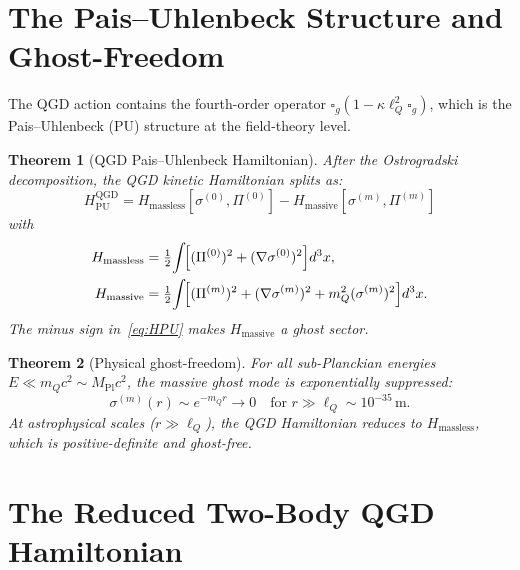 \documentclass[11pt,a4paper]{article}
\theoremstyle{plain}
\newtheorem{theorem}{Theorem}[section]
\theoremstyle{definition}
\theoremstyle{remark}
\newcommand{\lQ}{\ell_Q}
\newcommand{\mQ}{m_Q}
\newcommand{\boxg}{\square_g}
\newcommand{\half}{\tfrac{1}{2}}
\newcommand{\HPU}{H_{\mathrm{PU}}}
\begin{document}
\section{The Pais--Uhlenbeck Structure and Ghost-Freedom}
\label{sec:PU}

The QGD action contains the fourth-order operator
$\boxg(1 - \kappa\lQ^2\boxg)$, which is the Pais--Uhlenbeck (PU) structure
at the field-theory level.

\begin{theorem}[QGD Pais--Uhlenbeck Hamiltonian]\label{thm:PU}
After the Ostrogradski decomposition, the QGD kinetic Hamiltonian splits as:
\begin{equation}
  \HPU^{\mathrm{QGD}} = H_{\mathrm{massless}}[\sigma^{(0)},\Pi^{(0)}]
  - H_{\mathrm{massive}}[\sigma^{(m)},\Pi^{(m)}]
  \label{eq:HPU}
\end{equation}
with
\begin{align}
  H_{\mathrm{massless}} &= \half\!\int\!\Bigl[(\Pi^{(0)})^2 + (\nabla\sigma^{(0)})^2\Bigr]d^3x,\\
  H_{\mathrm{massive}}  &= \half\!\int\!\Bigl[(\Pi^{(m)})^2 + (\nabla\sigma^{(m)})^2
    + \mQ^2(\sigma^{(m)})^2\Bigr]d^3x.
\end{align}
The minus sign in~\eqref{eq:HPU} makes $H_{\mathrm{massive}}$ a ghost sector.
\end{theorem}

\begin{theorem}[Physical ghost-freedom]\label{thm:ghost_free}
For all sub-Planckian energies $E \ll \mQ c^2 \sim M_{\mathrm{Pl}}c^2$, the
massive ghost mode is exponentially suppressed:
\begin{equation}
  \sigma^{(m)}(r) \sim e^{-\mQ r}\to 0 \quad \text{for } r \gg \lQ \sim 10^{-35}\,\mathrm{m}.
  \label{eq:ghost_suppressed}
\end{equation}
At astrophysical scales ($r \gg \lQ$), the QGD Hamiltonian reduces to $H_{\mathrm{massless}}$,
which is positive-definite and ghost-free.
\end{theorem}

\section{The Reduced Two-Body QGD Hamiltonian}
\label{sec:two_body}
\end{document}
